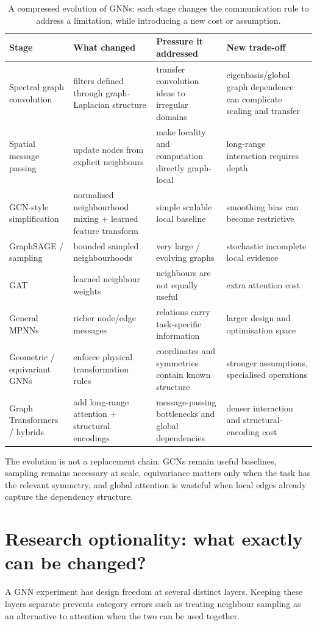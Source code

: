 \begin{table}[htbp]
\centering
\small
\begin{tabular}{p{}p{}p{}p{}}
\toprule
Stage & What changed & Pressure it addressed & New trade-off \\
\midrule
Spectral graph convolution & filters defined through graph-Laplacian structure & transfer convolution ideas to irregular domains & eigenbasis/global graph dependence can complicate scaling and transfer \\
Spatial message passing & update nodes from explicit neighbours & make locality and computation directly graph-local & long-range interaction requires depth \\
GCN-style simplification & normalised neighbourhood mixing + learned feature transform & simple scalable local baseline & smoothing bias can become restrictive \\
GraphSAGE / sampling & bounded sampled neighbourhoods & very large / evolving graphs & stochastic incomplete local evidence \\
GAT & learned neighbour weights & neighbours are not equally useful & extra attention cost \\
General MPNNs & richer node/edge messages & relations carry task-specific information & larger design and optimisation space \\
Geometric / equivariant GNNs & enforce physical transformation rules & coordinates and symmetries contain known structure & stronger assumptions, specialised operations \\
Graph Transformers / hybrids & add long-range attention + structural encodings & message-passing bottlenecks and global dependencies & denser interaction and structural-encoding cost \\
\bottomrule
\end{tabular}
\caption{A compressed evolution of GNNs: each stage changes the communication rule to address a limitation, while introducing a new cost or assumption.}
\label{tab:gnn-evolution}
\end{table}

The evolution is not a replacement chain.
GCNs remain useful baselines, sampling remains necessary at scale, equivariance matters only when the task has the relevant symmetry, and global attention is wasteful when local edges already capture the dependency structure.

\section{Research optionality: what exactly can be changed?}
A GNN experiment has design freedom at several distinct layers.
Keeping these layers separate prevents category errors such as treating neighbour sampling as an alternative to attention when the two can be used together.

